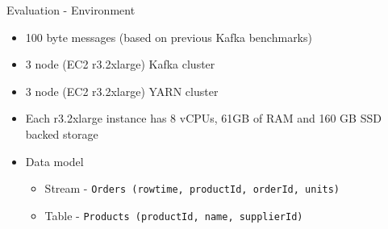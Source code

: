 \documentclass[newPxFont]{beamer}
\begin{document}
\begin{frame}[c]{Evaluation - Environment}
\begin{itemize}
	\item 100 byte messages (based on previous Kafka benchmarks) 
	\item 3 node (EC2 r3.2xlarge) Kafka cluster
	\item 3 node (EC2 r3.2xlarge) YARN cluster
	\item Each r3.2xlarge instance has 8 vCPUs, 61GB of RAM and 160 GB SSD backed storage
	\item Data model
		\begin{itemize}
			\item Stream - \texttt{Orders (rowtime, productId, orderId, units)} 
			\item Table - \texttt{Products (productId, name, supplierId)} 
		\end{itemize}
\end{itemize}
\end{frame}
\end{document}
